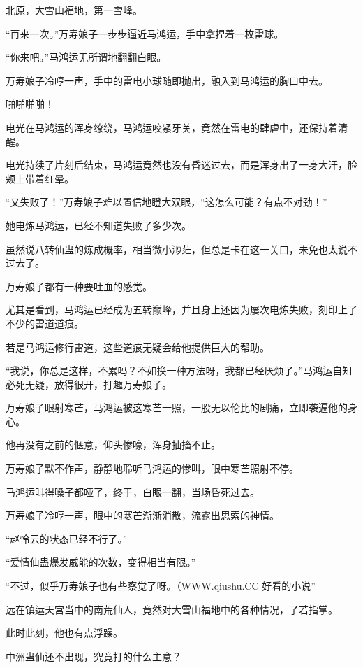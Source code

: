 
\begin{this_body}

北原，大雪山福地，第一雪峰。

“再来一次。”万寿娘子一步步逼近马鸿运，手中拿捏着一枚雷球。

“你来吧。”马鸿运无所谓地翻翻白眼。

万寿娘子冷哼一声，手中的雷电小球随即抛出，融入到马鸿运的胸口中去。

啪啪啪啪！

电光在马鸿运的浑身缭绕，马鸿运咬紧牙关，竟然在雷电的肆虐中，还保持着清醒。

电光持续了片刻后结束，马鸿运竟然也没有昏迷过去，而是浑身出了一身大汗，脸颊上带着红晕。

“又失败了！”万寿娘子难以置信地瞪大双眼，“这怎么可能？有点不对劲！”

她电炼马鸿运，已经不知道失败了多少次。

虽然说八转仙蛊的炼成概率，相当微小渺茫，但总是卡在这一关口，未免也太说不过去了。

万寿娘子都有一种要吐血的感觉。

尤其是看到，马鸿运已经成为五转巅峰，并且身上还因为屡次电炼失败，刻印上了不少的雷道道痕。

若是马鸿运修行雷道，这些道痕无疑会给他提供巨大的帮助。

“我说，你总是这样，不累吗？不如换一种方法呀，我都已经厌烦了。”马鸿运自知必死无疑，放得很开，打趣万寿娘子。

万寿娘子眼射寒芒，马鸿运被这寒芒一照，一股无以伦比的剧痛，立即袭遍他的身心。

他再没有之前的惬意，仰头惨嚎，浑身抽搐不止。

万寿娘子默不作声，静静地聆听马鸿运的惨叫，眼中寒芒照射不停。

马鸿运叫得嗓子都哑了，终于，白眼一翻，当场昏死过去。

万寿娘子冷哼一声，眼中的寒芒渐渐消散，流露出思索的神情。

“赵怜云的状态已经不行了。”

“爱情仙蛊爆发威能的次数，变得相当有限。”

“不过，似乎万寿娘子也有些察觉了呀。（WWW.qiushu.CC 好看的小说”

远在镇运天宫当中的南荒仙人，竟然对大雪山福地中的各种情况，了若指掌。

此时此刻，他也有点浮躁。

中洲蛊仙还不出现，究竟打的什么主意？


\end{this_body}
